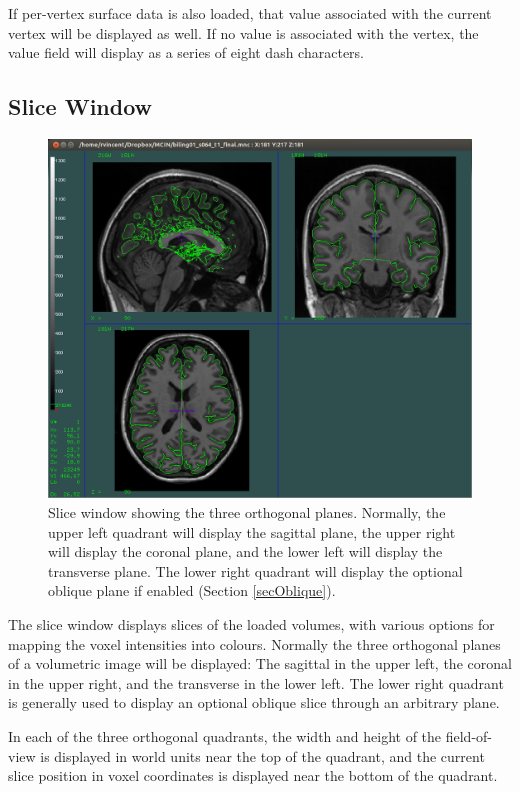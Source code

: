 \documentclass[11pt,letterpaper]{article}
\begin{document}
If per-vertex surface data is also loaded, that value associated with
the current vertex will be displayed as well. If no value is associated
with the vertex, the value field will display as a series of eight 
dash characters.

\subsection{Slice Window}

\begin{figure}
\centering
\includegraphics[width=0.8\linewidth]{display-slice.png}
\caption{Slice window showing the three orthogonal planes. Normally,
 the upper left quadrant will display the sagittal plane, the upper
 right will display the coronal plane, and the lower left will
 display the transverse plane. The lower right quadrant will display
 the optional oblique plane if enabled (Section \ref{secOblique}).}
\label{winSlice}
\end{figure}

The slice window displays slices of the loaded volumes, with various
options for mapping the voxel intensities into colours. Normally the
three orthogonal planes of a volumetric image will be displayed: The
sagittal in the upper left, the coronal in the upper right, and the
transverse in the lower left. The lower right quadrant is generally
used to display an optional oblique slice through an arbitrary plane.

In each of the three orthogonal quadrants, the width and height of the
field-of-view is displayed in world units near the top of the
quadrant, and the current slice position in voxel coordinates is
displayed near the bottom of the quadrant.
\end{document}
